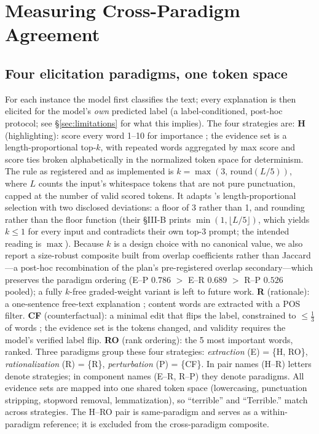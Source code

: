 \documentclass[11pt]{article}
\begin{document}
\section{Measuring Cross-Paradigm Agreement}
\label{sec:method}

\subsection{Four elicitation paradigms, one token space}
\label{sec:paradigms}

For each instance the model first classifies the text; every explanation is then elicited for the model's \emph{own} predicted label (a label-conditioned, post-hoc protocol; see \S\ref{sec:limitations} for what this implies). The four strategies are:
\textbf{H} (highlighting): score every word 1--10 for importance \citep{huang2023can}; the evidence set is a length-proportional top-$k$, with repeated words aggregated by max score and score ties broken alphabetically in the normalized token space for determinism. The rule as registered and as implemented is $k=\max(3,\,\mathrm{round}(L/5))$, where $L$ counts the input's whitespace tokens that are not pure punctuation, capped at the number of valid scored tokens. It adapts \citet{huang2023can}'s length-proportional selection with two disclosed deviations: a floor of 3 rather than 1, and rounding rather than the floor function (their §III-B prints $\min(1,\lfloor L/5\rfloor)$, which yields $k\le1$ for every input and contradicts their own top-3 prompt; the intended reading is $\max$). Because $k$ is a design choice with no canonical value, we also report a size-robust composite built from overlap coefficients rather than Jaccard---a post-hoc recombination of the plan's pre-registered overlap secondary---which preserves the paradigm ordering (E--P $0.786$ $>$ E--R $0.689$ $>$ R--P $0.526$ pooled); a fully $k$-free graded-weight variant is left to future work.
\textbf{R} (rationale): a one-sentence free-text explanation \citep{wiegreffe2021measuring}; content words are extracted with a POS filter.
\textbf{CF} (counterfactual): a minimal edit that flips the label, constrained to $\le\frac13$ of words \citep{ross2021explaining}; the evidence set is the tokens changed, and validity requires the model's verified label flip.
\textbf{RO} (rank ordering): the 5 most important words, ranked.
Three paradigms group these four strategies: \emph{extraction} (E) = \{H, RO\}, \emph{rationalization} (R) = \{R\}, \emph{perturbation} (P) = \{CF\}. In pair names (H--R) letters denote strategies; in component names (E--R, R--P) they denote paradigms. All evidence sets are mapped into one shared token space (lowercasing, punctuation stripping, stopword removal, lemmatization), so ``terrible'' and ``Terrible.'' match across strategies. The H--RO pair is same-paradigm and serves as a within-paradigm reference; it is excluded from the cross-paradigm composite.
\end{document}
